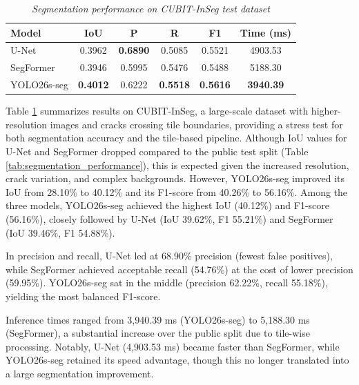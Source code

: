 \begin{table}[htbp]
    \centering
    \caption{\textit{Segmentation performance on CUBIT-InSeg test dataset}}
    \label{tab:cubit_inseg_performance}
    \begin{tabular}{lccccc}
        \toprule
        \textbf{Model} & \textbf{IoU}    & \textbf{P} & \textbf{R} & \textbf{F1}     & \textbf{Time (ms)} \\
        \midrule
        U-Net          & 0.3962          & \textbf{0.6890}    & 0.5085          & 0.5521          & 4903.53            \\
        SegFormer      & 0.3946          & 0.5995             & 0.5476          & 0.5488          & 5188.30            \\
        YOLO26s-seg    & \textbf{0.4012} & 0.6222             & \textbf{0.5518} & \textbf{0.5616} & \textbf{3940.39}   \\
        \bottomrule
    \end{tabular}
\end{table}

\hs Table \ref{tab:cubit_inseg_performance} summarizes results on CUBIT-InSeg, a large-scale dataset with higher-resolution images and cracks crossing tile boundaries, providing a stress test for both segmentation accuracy and the tile-based pipeline. Although IoU values for U-Net and SegFormer dropped compared to the public test split (Table \ref{tab:segmentation_performance}), this is expected given the increased resolution, crack variation, and complex backgrounds. However, YOLO26s-seg improved its IoU from 28.10\% to 40.12\% and its F1-score from 40.26\% to 56.16\%. Among the three models, YOLO26s-seg achieved the highest IoU (40.12\%) and F1-score (56.16\%), closely followed by U-Net (IoU 39.62\%, F1 55.21\%) and SegFormer (IoU 39.46\%, F1 54.88\%).

\hs In precision and recall, U-Net led at 68.90\% precision (fewest false positives), while SegFormer achieved acceptable recall (54.76\%) at the cost of lower precision (59.95\%). YOLO26s-seg sat in the middle (precision 62.22\%, recall 55.18\%), yielding the most balanced F1-score.

\hs Inference times ranged from 3,940.39 ms (YOLO26s-seg) to 5,188.30 ms (SegFormer), a substantial increase over the public split due to tile-wise processing. Notably, U-Net (4,903.53 ms) became faster than SegFormer, while YOLO26s-seg retained its speed advantage, though this no longer translated into a large segmentation improvement.

